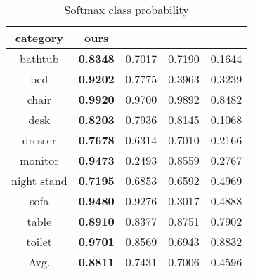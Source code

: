 \documentclass[10pt,twocolumn,letterpaper]{article}
\begin{document}
\begin{table}[h]
\caption{Softmax class probability}\label{synthesisSingleExp}
\vspace{-2mm}
\centering
\begin{small}
\begin{tabular}{|c|c|c|c|c|}
\hline
category & ours   & \cite{3dgan}   & \cite{kingma2013auto}  &  \cite{wu20153d}  \\ \hline \hline

bathtub    & \textbf{0.8348} & 0.7017 & 0.7190 & 0.1644 \\ \hline

bed     & \textbf{0.9202} & 0.7775 & 0.3963 & 0.3239 \\ \hline

chair   & \textbf{0.9920} & 0.9700  & 0.9892 & 0.8482 \\ \hline

desk      & \textbf{0.8203} & 0.7936 & 0.8145 & 0.1068  \\ \hline

dresser      & \textbf{0.7678} & 0.6314 & 0.7010 & 0.2166  \\ \hline

monitor & \textbf{0.9473} & 0.2493   & 0.8559 & 0.2767\\ \hline

night stand    & \textbf{0.7195} & 0.6853 & 0.6592 & 0.4969\\ \hline

sofa   & \textbf{0.9480} &  0.9276  & 0.3017 & 0.4888\\ \hline  

table    & \textbf{0.8910} & 0.8377 & 0.8751 &0.7902 \\ \hline
%
toilet   & \textbf{0.9701} &  0.8569  & 0.6943 & 0.8832\\ \hline \hline

Avg.   & \textbf{0.8811} &  0.7431   & 0.7006 & 0.4596\\ \hline 


\end{tabular}
\end{small}
\end{table}
\end{document}
